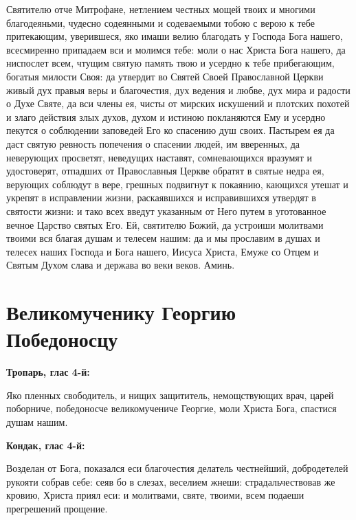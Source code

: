 Святителю отче Митрофане, нетлением честных мощей твоих и многими благодеяньми, чудесно содеянными и содеваемыми тобою с верою к тебе притекающим, уверившеся, яко имаши велию благодать у Господа Бога нашего, всесмиренно припадаем вси и молимся тебе: моли о нас Христа Бога нашего, да ниспослет всем, чтущим святую память твою и усердно к тебе прибегающим, богатыя милости Своя: да утвердит во Святей Своей Православной Церкви живый дух правыя веры и благочестия, дух ведения и любве, дух мира и радости о Духе Святе, да вси члены ея, чисты от мирских искушений и плотских похотей и злаго действия злых духов, духом и истиною покланяются Ему и усердно пекутся о соблюдении заповедей Его ко спасению душ своих. Пастырем ея да даст святую ревность попечения о спасении людей, им вверенных, да неверующих просветят, неведущих наставят, сомневающихся вразумят и удостоверят, отпадших от Православныя Церкве обратят в святые недра ея, верующих соблюдут в вере, грешных подвигнут к покаянию, кающихся утешат и укрепят в исправлении жизни, раскаявшихся и исправившихся утвердят в святости жизни: и тако всех введут указанным от Него путем в уготованное вечное Царство святых Его. Ей, святителю Божий, да устроиши молитвами твоими вся благая душам и телесем нашим: да и мы прославим в душах и телесех наших Господа и Бога нашего, Иисуса Христа, Емуже со Отцем и Святым Духом слава и держава во веки веков. Аминь.\longpage{}\mychapterending


 

\section{Великомученику Георгию Победоносцу}
 
\bfseries Тропарь, глас 4-й:\normalfont{}


Яко пленных свободитель, и нищих защититель, немощствующих врач, царей поборниче, победоносче великомучениче Георгие, моли Христа Бога, спастися душам нашим.


\medskip
\bfseries Кондак, глас 4-й:\normalfont{}\nopagebreak


Возделан от Бога, показался еси благочестия делатель честнейший, добродетелей рукояти собрав себе: сеяв бо в слезах, веселием жнеши: страдальчествовав же кровию, Христа приял еси: и молитвами, святе, твоими, всем подаеши прегрешений прощение.


